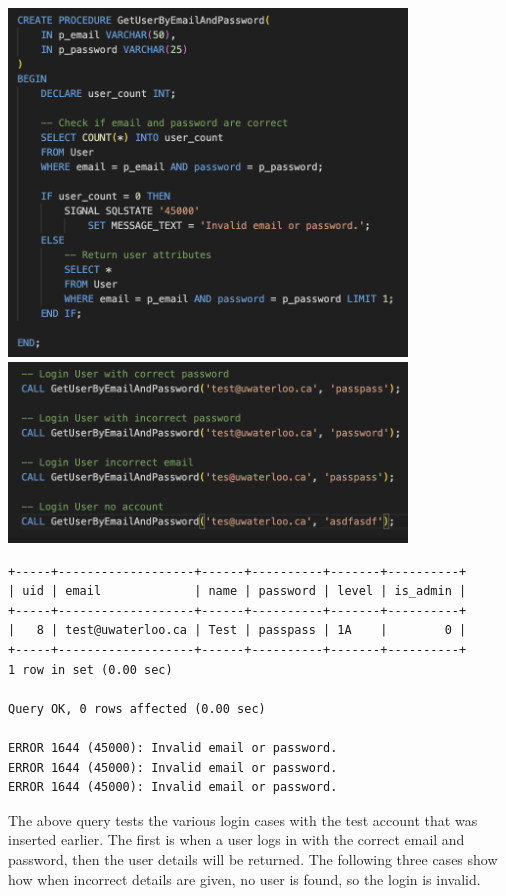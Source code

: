 \documentclass[12pt, a4paper]{article}
\begin{document}
\begin{center}
    \includegraphics[width=400px]{R6/q2}
    \includegraphics[width=400px]{R6/q2_1}
    \begin{verbatim}
+-----+-------------------+------+----------+-------+----------+
| uid | email             | name | password | level | is_admin |
+-----+-------------------+------+----------+-------+----------+
|   8 | test@uwaterloo.ca | Test | passpass | 1A    |        0 |
+-----+-------------------+------+----------+-------+----------+
1 row in set (0.00 sec)

Query OK, 0 rows affected (0.00 sec)

ERROR 1644 (45000): Invalid email or password.
ERROR 1644 (45000): Invalid email or password.
ERROR 1644 (45000): Invalid email or password.
    \end{verbatim}
\end{center}
The above query tests the various login cases with the test account that was inserted earlier. The first is when a user logs in with the correct email and password, then the user details will be returned. The following three cases show how when incorrect details are given, no user is found, so the login is invalid. 
\end{document}
